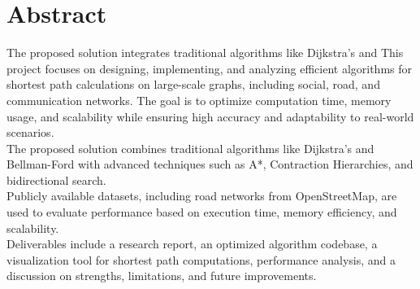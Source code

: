 \vspace{2in}
\chapter*{Abstract}

The proposed solution integrates traditional algorithms like Dijkstra’s and 
This project focuses on designing, implementing, and analyzing efficient algorithms for shortest path calculations on large-scale graphs, including social, road, and communication networks. The goal is to optimize computation time, memory usage, and scalability while ensuring high accuracy and adaptability to real-world scenarios. \\

The proposed solution combines traditional algorithms like Dijkstra’s and Bellman-Ford with advanced techniques such as A*, Contraction Hierarchies, and bidirectional search. \\

Publicly available datasets, including road networks from OpenStreetMap, are used to evaluate performance based on execution time, memory efficiency, and scalability. \\

Deliverables include a research report, an optimized algorithm codebase, a visualization tool for shortest path computations, performance analysis, and a discussion on strengths, limitations, and future improvements.

